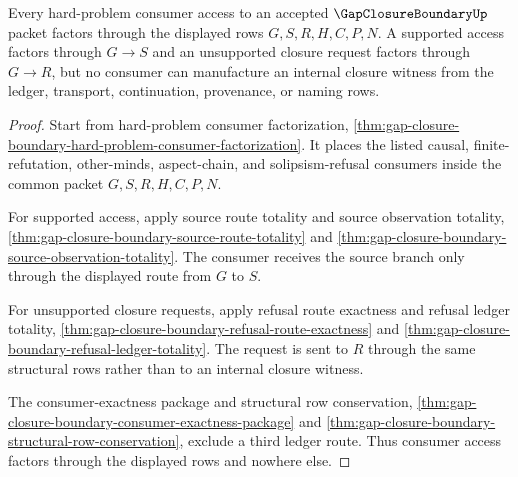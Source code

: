 \begin{theorem}
\label{thm:gap-closure-boundary-consumer-ledger-factorization}
Every hard-problem consumer access to an accepted $\GapClosureBoundaryUp$ packet factors through the displayed rows $G,S,R,H,C,P,N$. A supported access factors through $G \longrightarrow S$ and an unsupported closure request factors through $G \longrightarrow R$, but no consumer can manufacture an internal closure witness from the ledger, transport, continuation, provenance, or naming rows.
\end{theorem}
\begin{proof}
Start from hard-problem consumer factorization, \autoref{thm:gap-closure-boundary-hard-problem-consumer-factorization}. It places the listed causal, finite-refutation, other-minds, aspect-chain, and solipsism-refusal consumers inside the common packet $G,S,R,H,C,P,N$.

For supported access, apply source route totality and source observation totality, \autoref{thm:gap-closure-boundary-source-route-totality} and \autoref{thm:gap-closure-boundary-source-observation-totality}. The consumer receives the source branch only through the displayed route from $G$ to $S$.

For unsupported closure requests, apply refusal route exactness and refusal ledger totality, \autoref{thm:gap-closure-boundary-refusal-route-exactness} and \autoref{thm:gap-closure-boundary-refusal-ledger-totality}. The request is sent to $R$ through the same structural rows rather than to an internal closure witness.

The consumer-exactness package and structural row conservation, \autoref{thm:gap-closure-boundary-consumer-exactness-package} and \autoref{thm:gap-closure-boundary-structural-row-conservation}, exclude a third ledger route. Thus consumer access factors through the displayed rows and nowhere else.
\end{proof}

